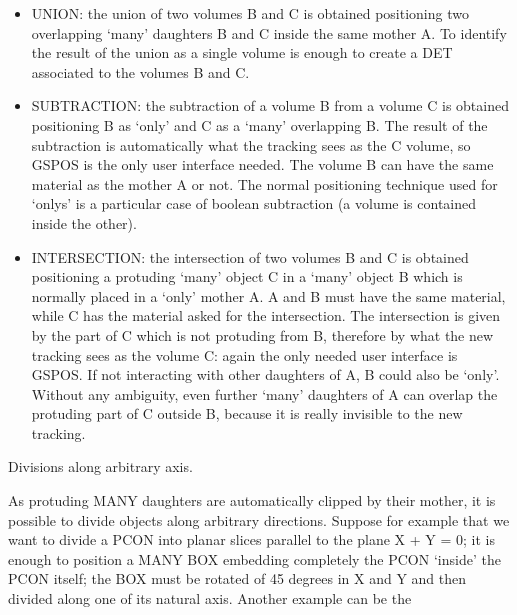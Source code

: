 \begin{itemize}
\item UNION: the union of two volumes B and C is obtained positioning two
             overlapping `many' daughters B and C inside the same mother A.
             To identify the result of the union as a single volume is enough
             to create a DET associated to the volumes B and C. 
\item SUBTRACTION: the subtraction of a volume B from a volume C is obtained
                   positioning B as `only' and C as a `many' overlapping B.
                   The result of the subtraction is automatically what the
                   tracking sees as the C volume, so GSPOS is the only user
                   interface needed. The volume B can have the same material as
                   the mother A or not. The normal positioning technique used
                   for `onlys' is a particular case of boolean subtraction (a
                   volume is contained inside the other).
\item INTERSECTION: the intersection of two volumes B and C is obtained 
                    positioning a protuding `many' object C in a `many' object
                    B which is normally placed in a `only' mother A. A and B
                    must have the same material, while C has the material asked
                    for the intersection. The intersection is given by the part
                    of C which is not protuding from B, therefore by what the
                    new tracking sees as the volume C: again the only needed
                    user interface is GSPOS. If not interacting with other
                    daughters of A, B could also be `only'. Without any
                    ambiguity, even further `many' daughters of A can overlap
                    the protuding part of C outside B, because it is really
                    invisible to the new tracking. 
\end{itemize} 
\begin{center}
Divisions along arbitrary axis.\\[.5cm]          
\end{center}
As protuding MANY daughters are automatically clipped by their mother, it is
possible to divide objects along arbitrary directions. Suppose for example
that we want to divide a PCON into planar slices parallel to the plane
X + Y = 0; it is enough to position a MANY BOX embedding completely the
PCON `inside' the PCON itself; the BOX must be rotated of 45 degrees in X and
Y and then divided along one of its natural axis. Another example can be the
